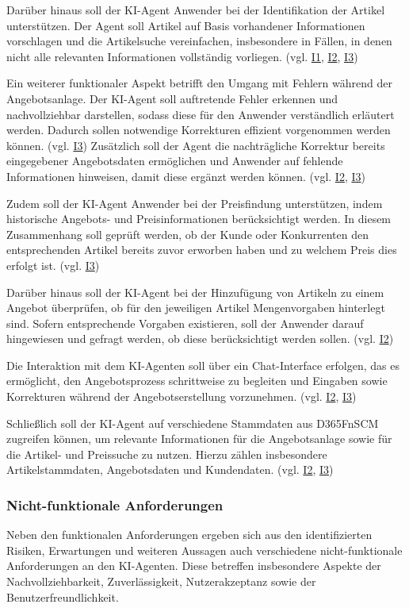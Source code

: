 Darüber hinaus soll der \ac{KI}-Agent Anwender bei der Identifikation der Artikel unterstützen. Der Agent soll Artikel auf Basis vorhandener Informationen vorschlagen und die Artikelsuche vereinfachen, insbesondere in Fällen, in denen nicht alle relevanten Informationen vollständig vorliegen. (vgl. \hyperref[anhang:i1]{I1}, \hyperref[anhang:i2]{I2}, \hyperref[anhang:i3]{I3})

Ein weiterer funktionaler Aspekt betrifft den Umgang mit Fehlern während der Angebotsanlage. Der \ac{KI}-Agent soll auftretende Fehler erkennen und nachvollziehbar darstellen, sodass diese für den Anwender verständlich erläutert werden. Dadurch sollen notwendige Korrekturen effizient vorgenommen werden können. (vgl. \hyperref[anhang:i3]{I3}) Zusätzlich soll der Agent die nachträgliche Korrektur bereits eingegebener Angebotsdaten ermöglichen und Anwender auf fehlende Informationen hinweisen, damit diese ergänzt werden können. (vgl. \hyperref[anhang:i2]{I2}, \hyperref[anhang:i3]{I3})

Zudem soll der \ac{KI}-Agent Anwender bei der Preisfindung unterstützen, indem historische Angebots- und Preisinformationen berücksichtigt werden. In diesem Zusammenhang soll geprüft werden, ob der Kunde oder Konkurrenten den entsprechenden Artikel bereits zuvor erworben haben und zu welchem Preis dies erfolgt ist. (vgl. \hyperref[anhang:i3]{I3})

Darüber hinaus soll der \ac{KI}-Agent bei der Hinzufügung von Artikeln zu einem Angebot überprüfen, ob für den jeweiligen Artikel Mengenvorgaben hinterlegt sind. Sofern entsprechende Vorgaben existieren, soll der Anwender darauf hingewiesen und gefragt werden, ob diese berücksichtigt werden sollen. (vgl. \hyperref[anhang:i2]{I2})

Die Interaktion mit dem \ac{KI}-Agenten soll über ein Chat-Interface erfolgen, das es ermöglicht, den Angebotsprozess schrittweise zu begleiten und Eingaben sowie Korrekturen während der Angebotserstellung vorzunehmen. (vgl. \hyperref[anhang:i2]{I2}, \hyperref[anhang:i3]{I3})

Schließlich soll der \ac{KI}-Agent auf verschiedene Stammdaten aus \ac{D365FnSCM} zugreifen können, um relevante Informationen für die Angebotsanlage sowie für die Artikel- und Preissuche zu nutzen. Hierzu zählen insbesondere Artikelstammdaten, Angebotsdaten und Kundendaten. (vgl.  \hyperref[anhang:i2]{I2}, \hyperref[anhang:i3]{I3})


\subsubsection{Nicht-funktionale Anforderungen}
Neben den funktionalen Anforderungen ergeben sich aus den identifizierten Risiken, Erwartungen und weiteren Aussagen auch verschiedene nicht-funktionale Anforderungen an den \ac{KI}-Agenten. Diese betreffen insbesondere Aspekte der Nachvollziehbarkeit, Zuverlässigkeit, Nutzerakzeptanz sowie der Benutzerfreundlichkeit.

